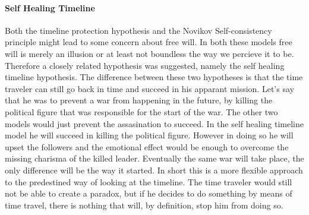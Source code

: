 \paragraph{Self Healing Timeline}
Both the timeline protection hypothesis and the Novikov Self-consistency principle might lead to some concern about free will. In both these models free will is merely an illusion or at least not boundless the way we percieve it to be. Therefore a closely related hypothesis was suggested, namely the self healing timeline hypothesis. The difference between these two hypotheses is that the time traveler can still go back in time and succeed in his apparant mission. Let's say that he was to prevent a war from happening in the future, by killing the political figure that was responsible for the start of the war. The other two models would just prevent the assasination to succeed. In the self healing timeline model he will succeed in killing the political figure. However in doing so he will upset the followers and the emotional effect would be enough to overcome the missing charisma of the killed leader. Eventually the same war will take place, the only difference will be the way it started. In short this is a more flexible approach to the predestined way of looking at the timeline. The time traveler would still not be able to create a paradox, but if he decides to do something by means of time travel, there is nothing that will, by definition, stop him from doing so.

